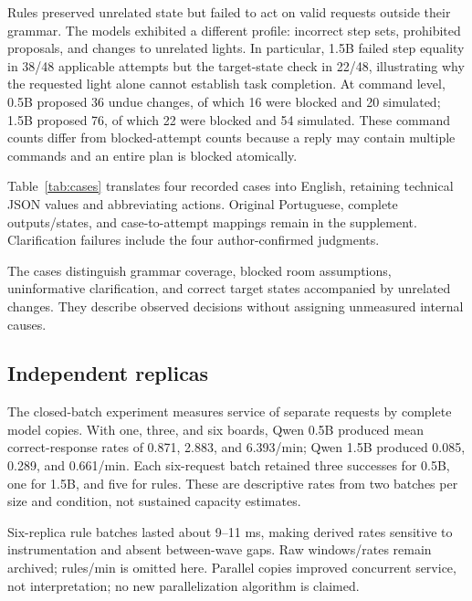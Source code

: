 \documentclass[letterpaper,conference]{IEEEtran}
\providecommand{\StudyPrefix}{}
\begin{document}
Rules preserved unrelated state but failed to act on valid requests outside their grammar. The models exhibited a different profile: incorrect step sets, prohibited proposals, and changes to unrelated lights. In particular, 1.5B failed step equality in 38/48 applicable attempts but the target-state check in 22/48, illustrating why the requested light alone cannot establish task completion. At command level, 0.5B proposed 36 undue changes, of which 16 were blocked and 20 simulated; 1.5B proposed 76, of which 22 were blocked and 54 simulated. These command counts differ from blocked-attempt counts because a reply may contain multiple commands and an entire plan is blocked atomically.

Table~\ref{tab:cases} translates four recorded cases into English, retaining technical JSON values and abbreviating actions. Original Portuguese, complete outputs/states, and case-to-attempt mappings remain in the supplement. Clarification failures include the four author-confirmed judgments.


The cases distinguish grammar coverage, blocked room assumptions, uninformative clarification, and correct target states accompanied by unrelated changes. They describe observed decisions without assigning unmeasured internal causes.

\subsection{Independent replicas}
The closed-batch experiment measures service of separate requests by complete model copies. With one, three, and six boards, Qwen 0.5B produced mean correct-response rates of 0.871, 2.883, and 6.393/min; Qwen 1.5B produced 0.085, 0.289, and 0.661/min. Each six-request batch retained three successes for 0.5B, one for 1.5B, and five for rules. These are descriptive rates from two batches per size and condition, not sustained capacity estimates.

Six-replica rule batches lasted about 9--11 ms, making derived rates sensitive to instrumentation and absent between-wave gaps. Raw windows/rates remain archived; rules/min is omitted here. Parallel copies improved concurrent service, not interpretation; no new parallelization algorithm is claimed.
\end{document}
